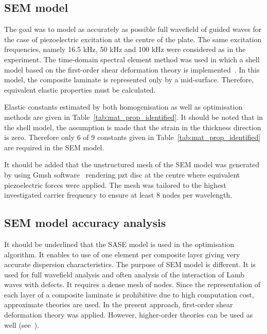 \documentclass[preprint,12pt]{elsarticle}
\begin{document}
\subsection{SEM model}
The goal was to model as accurately as possible full wavefield of guided waves for the case of piezoelectric excitation at the centre of the plate. 
The same excitation frequencies, namely 16.5 kHz, 50 kHz and 100 kHz were considered as in the experiment. 
The time-domain spectral element method was used in which a shell model based on the first-order shear deformation theory is implemented~\cite{Kudela2020a}. 
In this model, the composite laminate is represented only by a mid-surface. Therefore, equivalent elastic properties must be calculated. 

Elastic constants estimated by both homogenisation as well as optimisation methods are given in Table~\ref{tab:mat_prop_identified}. 
It should be noted that in the shell model, the assumption is made that the strain in the thickness direction is zero. 
Therefore only 6 of 9 constants given in Table~\ref{tab:mat_prop_identified} are required in the SEM model.

It should be added that the unstructured mesh of the SEM model was generated by using Gmsh software~\cite{Geuzaine2009} rendering pzt disc at the centre where equivalent piezoelectric forces were applied. 
The mesh was tailored to the highest investigated carrier frequency to ensure at least 8 nodes per wavelength.

\subsection{SEM model accuracy analysis}
It should be underlined that the SASE model is used in the optimisation algorithm. 
It enables to use of one element per composite layer giving very accurate dispersion characteristics. The purpose of SEM model is different. 
It is used for full wavefield analysis and often analysis of the interaction of Lamb waves with defects. 
It requires a dense mesh of nodes. 
Since the representation of each layer of a composite laminate is prohibitive due to high computation cost, approximate theories are used. 
In the present approach, first-order shear deformation theory was applied. 
However, higher-order theories can be used as well (see~\cite{Ostachowicz2012}).
\end{document}
